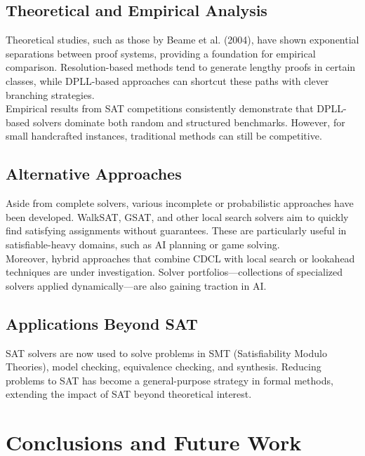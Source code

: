 \documentclass[11pt]{article}
\begin{document}
\subsection{Theoretical and Empirical Analysis}
\hspace*{2em}
Theoretical studies, such as those by Beame et al. (2004), have shown exponential separations between proof systems, providing a foundation for empirical comparison. Resolution-based methods tend to generate lengthy proofs in certain classes, while DPLL-based approaches can shortcut these paths with clever branching strategies.\\
\hspace*{2em}
Empirical results from SAT competitions consistently demonstrate that DPLL-based solvers dominate both random and structured benchmarks. However, for small handcrafted instances, traditional methods can still be competitive.

\subsection{Alternative Approaches}
\hspace*{2em}
Aside from complete solvers, various incomplete or probabilistic approaches have been developed. WalkSAT, GSAT, and other local search solvers aim to quickly find satisfying assignments without guarantees. These are particularly useful in satisfiable-heavy domains, such as AI planning or game solving.\\
\hspace*{2em}
Moreover, hybrid approaches that combine CDCL with local search or lookahead techniques are under investigation. Solver portfolios—collections of specialized solvers applied dynamically—are also gaining traction in AI.

\subsection{Applications Beyond SAT}
\hspace*{2em}
SAT solvers are now used to solve problems in SMT (Satisfiability Modulo Theories), model checking, equivalence checking, and synthesis. Reducing problems to SAT has become a general-purpose strategy in formal methods, extending the impact of SAT beyond theoretical interest.

\section{Conclusions and Future Work}
\end{document}
